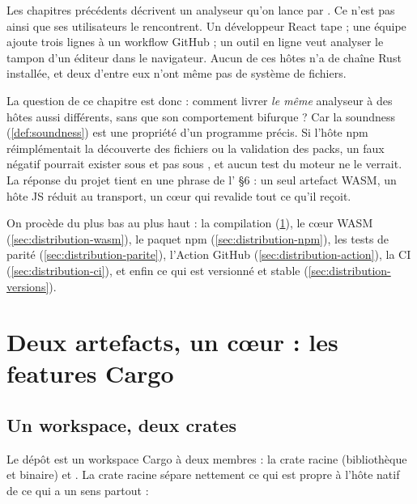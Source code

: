 Les chapitres précédents décrivent un analyseur qu'on lance par . Ce n'est pas ainsi que ses utilisateurs le rencontrent. Un développeur React tape  ; une équipe ajoute trois lignes à un workflow GitHub ; un outil en ligne veut analyser le tampon d'un éditeur dans le navigateur. Aucun de ces hôtes n'a de chaîne Rust installée, et deux d'entre eux n'ont même pas de système de fichiers.

La question de ce chapitre est donc : comment livrer \emph{le même} analyseur à des hôtes aussi différents, sans que son comportement bifurque ? Car la soundness (\cref{def:soundness}) est une propriété d'un programme précis. Si l'hôte npm réimplémentait la découverte des fichiers ou la validation des packs, un faux négatif pourrait exister sous  et pas sous , et aucun test du moteur ne le verrait. La réponse du projet tient en une phrase de l' §6 : un seul artefact WASM, un hôte JS réduit au transport, un cœur qui revalide tout ce qu'il reçoit.

On procède du plus bas au plus haut : la compilation (\cref{sec:distribution-features}), le cœur WASM (\cref{sec:distribution-wasm}), le paquet npm (\cref{sec:distribution-npm}), les tests de parité (\cref{sec:distribution-parite}), l'Action GitHub (\cref{sec:distribution-action}), la CI (\cref{sec:distribution-ci}), et enfin ce qui est versionné et stable (\cref{sec:distribution-versions}).

\section{Deux artefacts, un cœur : les features Cargo}
\label{sec:distribution-features}

\subsection{Un workspace, deux crates}

Le dépôt est un workspace Cargo à deux membres : la crate racine  (bibliothèque et binaire) et . La crate racine sépare nettement ce qui est propre à l'hôte natif de ce qui a un sens partout :


